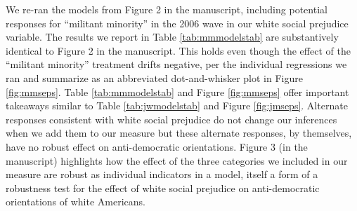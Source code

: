 \documentclass[11pt,]{article}
\begin{document}
We re-ran the models from Figure 2 in the manuscript, including
potential responses for ``militant minority'' in the 2006 wave in our
white social prejudice variable. The results we report in Table
\ref{tab:mmmodelstab} are substantively identical to Figure 2 in the
manuscript. This holds even though the effect of the ``militant
minority'' treatment drifts negative, per the individual regressions we
ran and summarize as an abbreviated dot-and-whisker plot in Figure
\ref{fig:mmseps}. Table \ref{tab:mmmodelstab} and Figure
\ref{fig:mmseps} offer important takeaways similar to Table
\ref{tab:jwmodelstab} and Figure \ref{fig:jmseps}. Alternate responses
consistent with white social prejudice do not change our inferences when
we add them to our measure but these alternate responses, by themselves,
have no robust effect on anti-democratic orientations. Figure 3 (in the
manuscript) highlights how the effect of the three categories we
included in our measure are robust as individual indicators in a model,
itself a form of a robustness test for the effect of white social
prejudice on anti-democratic orientations of white Americans.

 
  \providecommand{\huxb}[2]{\arrayrulecolor[RGB]{#1}\global\arrayrulewidth=#2pt}
  \providecommand{\huxvb}[2]{\color[RGB]{#1}\vrule width #2pt}
  \providecommand{\huxtpad}[1]{\rule{0pt}{\baselineskip+#1}}
  \providecommand{\huxbpad}[1]{\rule[-#1]{0pt}{#1}}
\end{document}
